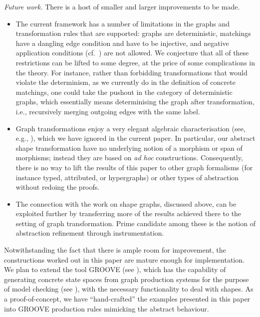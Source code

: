 \medskip\noindent\textit{Future work.}
%
There is a host of smaller and larger improvements to be made. 
%
\begin{itemize}
\item The current framework has a number of limitations in the graphs
  and transformation rules that are supported: graphs are deterministic,
  matchings have a dangling edge condition and have to be injective, and
  negative application conditions (cf.\ \cite{HabHecTae96}) are not allowed. We
  conjecture that all of these restrictions can be lifted to some degree, at
  the price of some complications in the theory. For instance, rather than
  forbidding transformations that would violate the determinism, as we
  currently do in the definition of concrete matchings, one could take the
  pushout in the category of deterministic graphs, which essentially means
  determinising the graph after transformation, i.e., recursively merging
  outgoing edges with the same label.
\item Graph transformations enjoy a very elegant algebraic characterisation
  (see, e.g., \cite{DPO}), which we have ignored in the current paper. In
  particular, our abstract shape transformation have no underlying notion of a
  morphism or span of morphisms; instead they are based on \emph{ad hoc}
  constructions. Consequently, there is no way to lift the results of this
  paper to other graph formalisms (for instance typed, attributed, or
  hypergraphs) or other types of abstraction without redoing the proofs.
\item The connection with the work on shape graphs, discussed above, can be
  exploited further by transferring more of the results achieved there to the
  setting of graph transformation. Prime candidate among these is the notion of
  abstraction refinement through instrumentation.
\end{itemize}
%
Notwithstanding the fact that there is ample room for improvement, the
constructions worked out in this paper are mature enough for implementation. We
plan to extend the tool GROOVE (see \cite{Rens03-agtive}), which has the
capability of generating concrete state spaces from graph production systems
for the purpose of model checking (see \cite{RenSchVar04}), with the necessary
functionality to deal with shapes. As a proof-of-concept, we have
``hand-crafted'' the examples presented in this paper into GROOVE production
rules mimicking the abstract behaviour.

